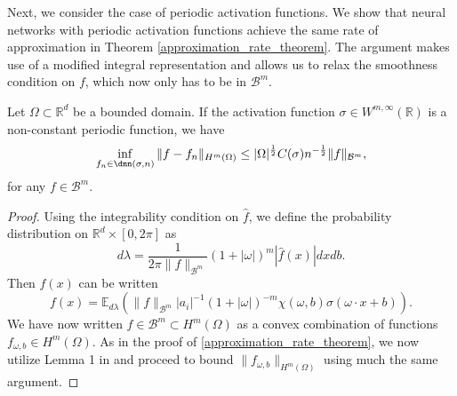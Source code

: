 Next, we consider the case of periodic activation functions. We show that neural networks with periodic activation functions achieve the same rate of approximation in Theorem \ref{approximation_rate_theorem}. The argument makes use of a modified integral representation and allows us to relax the smoothness condition on $f$, which now only has to be in $\mathcal{B}^m$.
\begin{theorem}\label{periodic-activation}
 Let $\Omega\subset \mathbb{R}^d$ be a bounded domain. If the activation function $\sigma\in W^{m,\infty}(\mathbb{R})$ is a non-constant periodic function, we have
 \begin{equation}
  \inf_{f_n\in \dnn(\sigma,n)}\|f - f_n\|_{H^m(\Omega)} \leq |\Omega|^{\frac{1}{2}}C(\sigma)n^{-\frac{1}{2}}\|f\|_{\mathcal{B}^m},
 \end{equation}
 for any $f\in \mathcal{B}^{m}$.
\end{theorem}
\begin{proof}
 Using the integrability condition on $\hat{f}$, we define the probability distribution on $\mathbb{R}^d \times [0,2\pi]$ as
 \begin{equation}
  d\lambda = \frac{1}{2\pi\|f\|_{\mathcal{B}^m}}(1 + |\omega|)^m|\hat{f}(x)|dxdb.
 \end{equation}
 Then $f(x)$ can be written
 \begin{equation}\label{periodic_representation}
 f(x) = \mathbb{E}_{d\lambda}\left(\|f\|_{\mathcal{B}^m}|a_i|^{-1}(1 + |\omega|)^{-m}\chi(\omega,b)\sigma\left(\omega\cdot x + b\right)\right).
 \end{equation}
 We have now written $f\in \mathcal{B}^m\subset H^m(\Omega)$ as a convex combination of functions $f_{\omega,b}\in H^m(\Omega)$. As in the proof of \ref{approximation_rate_theorem}, we now utilize Lemma 1 in \cite{barron1993universal} and proceed to bound $\|f_{\omega,b}\|_{H^m(\Omega)}$ using much the same argument.
\end{proof}
